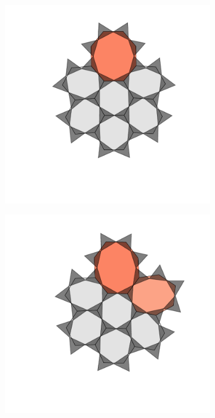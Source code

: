 \begin{figure}[bt]
\begin{subfigure}[b]{0.18\textwidth}
         \caption{}
         \label{fig:triraftalgtrial2}
     \end{subfigure}
     \hfill
     \begin{subfigure}[b]{0.18\textwidth}
         \centering
         \includegraphics[width=\textwidth]{./figures/bilayers/alg_6.pdf}
         \caption{}
         \label{fig:triraftalgtrial3}
     \end{subfigure}
     \hfill
      \begin{subfigure}[b]{0.18\textwidth}
         \centering
         \includegraphics[width=\textwidth]{./figures/bilayers/alg_7.pdf}

\end{subfigure}
\end{figure}

